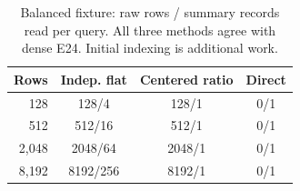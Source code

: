 \begin{table}[t]
\centering
\small
\caption{Balanced fixture: raw rows / summary records read per query. All three methods agree with dense E24. Initial indexing is additional work.}
\label{tab:reads}
\begin{tabular}{rccc}
\toprule
Rows & Indep. flat & Centered ratio & Direct \\
\midrule
128 & 128/4 & 128/1 & 0/1 \\
512 & 512/16 & 512/1 & 0/1 \\
2,048 & 2048/64 & 2048/1 & 0/1 \\
8,192 & 8192/256 & 8192/1 & 0/1 \\
\bottomrule
\end{tabular}
\end{table}
